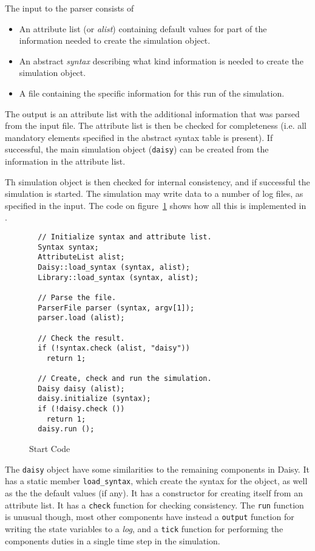 \documentclass{article}
\newcommand{\cplusplus}%
{{\leavevmode{\rm{\hbox{C\hskip -0.1ex\raise 0.5ex\hbox{\tiny ++}}}}}}
\newcommand{\code}[1]{\texttt{#1}}
\begin{document}
\begin{samepage}
  The input to the parser consists of
  \begin{itemize}
  \item An attribute list (or \emph{alist}) containing default values
    for part of the information needed to create the simulation object.
  \item An abstract \emph{syntax} describing what kind information is
    needed to create the simulation object.
  \item A file containing the specific information for this run of the
    simulation. 
  \end{itemize}
\end{samepage}

The output is an attribute list with the additional information that
was parsed from the input file.  The attribute list is then be checked
for completeness (i.e. all mandatory elements specified in the
abstract syntax table is present).  If successful, the main simulation
object (\code{daisy}) can be created from the information in the
attribute list.  

Th simulation object is then checked for internal consistency, and if
successful the simulation is started.  The simulation may write data
to a number of log files, as specified in the input.  The code on
figure~\ref{fig:start-code} shows how all this is implemented in
\cplusplus{}.

\begin{figure}[htbp]
\begin{verbatim}
  // Initialize syntax and attribute list.
  Syntax syntax;
  AttributeList alist;
  Daisy::load_syntax (syntax, alist);
  Library::load_syntax (syntax, alist);

  // Parse the file.
  ParserFile parser (syntax, argv[1]);
  parser.load (alist);

  // Check the result.
  if (!syntax.check (alist, "daisy"))
    return 1;

  // Create, check and run the simulation.
  Daisy daisy (alist);
  daisy.initialize (syntax);
  if (!daisy.check ())
    return 1;
  daisy.run ();
\end{verbatim}
  \caption{Start Code}
  \label{fig:start-code}
\end{figure}

The \code{daisy} object have some similarities to the remaining
components in Daisy.  It has a static member \code{load\_syntax},
which create the syntax for the object, as well as the the default
values (if any).  It has a constructor for creating itself from an
attribute list.  It has a \code{check} function for checking
consistency.  The \code{run} function is unusual though, most other
components have instead a \code{output} function for writing the state
variables to a \emph{log}, and a \code{tick} function for performing
the components duties in a single time step in the simulation.
\end{document}
